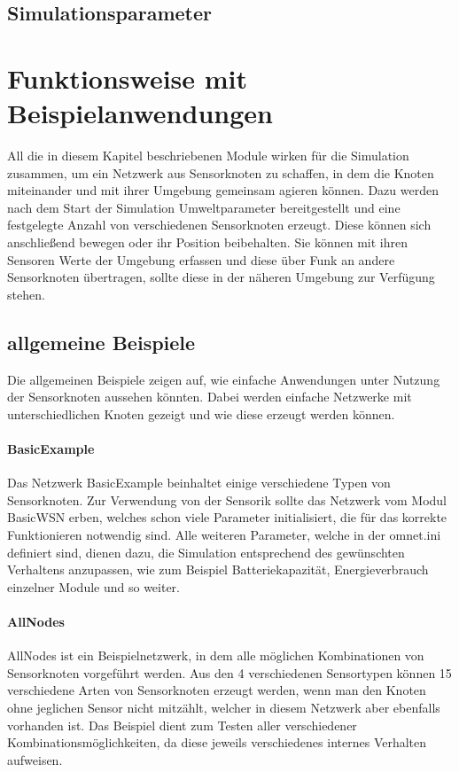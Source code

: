 \subsection{Simulationsparameter}

\section{Funktionsweise mit Beispielanwendungen}

All die in diesem Kapitel beschriebenen Module wirken für die Simulation zusammen, um ein Netzwerk aus Sensorknoten zu schaffen, in dem die Knoten miteinander und mit ihrer Umgebung gemeinsam agieren können. Dazu werden nach dem Start der Simulation Umweltparameter bereitgestellt und eine festgelegte Anzahl von verschiedenen Sensorknoten erzeugt. Diese können sich anschließend bewegen oder ihr Position beibehalten. Sie können mit ihren Sensoren Werte der Umgebung erfassen und diese über Funk an andere Sensorknoten übertragen, sollte diese in der näheren Umgebung zur Verfügung stehen.

\subsection*{allgemeine Beispiele}

Die allgemeinen Beispiele zeigen auf, wie einfache Anwendungen unter Nutzung der Sensorknoten aussehen könnten. Dabei werden einfache Netzwerke mit unterschiedlichen Knoten gezeigt und wie diese erzeugt werden können.

\paragraph{BasicExample}

Das Netzwerk BasicExample beinhaltet einige verschiedene Typen von Sensorknoten. Zur Verwendung von der Sensorik sollte das Netzwerk vom Modul BasicWSN erben, welches schon viele Parameter initialisiert, die für das korrekte Funktionieren notwendig sind. Alle weiteren Parameter, welche in der omnet.ini definiert sind, dienen dazu, die Simulation entsprechend des gewünschten Verhaltens anzupassen, wie zum Beispiel Batteriekapazität, Energieverbrauch einzelner Module und so weiter.

\paragraph{AllNodes}

AllNodes ist ein Beispielnetzwerk, in dem alle möglichen Kombinationen von Sensorknoten vorgeführt werden. Aus den 4 verschiedenen Sensortypen können 15 verschiedene Arten von Sensorknoten erzeugt werden, wenn man den Knoten ohne jeglichen Sensor nicht mitzählt, welcher in diesem Netzwerk aber ebenfalls vorhanden ist. Das Beispiel dient zum Testen aller verschiedener Kombinationsmöglichkeiten, da diese jeweils verschiedenes internes Verhalten aufweisen.

